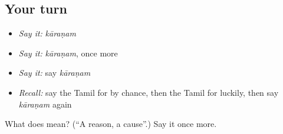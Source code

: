 \subsection*{Your turn}
\begin{itemize}
\raggedright
  \item \emph{Say it:} \emph{kāraṇam}
  \item \emph{Say it:} \emph{kāraṇam}, once more
  \item \emph{Say it:} say \emph{kāraṇam}
  \item \emph{Recall:} say the Tamil for by chance, then the Tamil for luckily, then say \emph{kāraṇam} again
\end{itemize}

\begin{tcolorbox}[breakable,colback=teal!4,colframe=teal!35!black,title={Before you move on}]
What does  mean? (\textquotedblleft{}A reason, a cause\textquotedblright{}.) Say it once more.
\end{tcolorbox}
